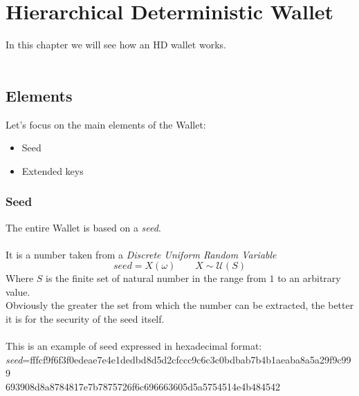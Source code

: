 
\chapter{Hierarchical Deterministic Wallet} %

\label{hd wallet} %




In this chapter we will see how an HD wallet works.
\\ \\
\section{Elements}
Let's focus on the main elements of the Wallet:
\begin{itemize}[label=$\diamond$]
	\item Seed
	\item Extended keys
\end{itemize}

\subsection{Seed}
The entire Wallet is based on a \textit{seed}.
\\ \\
It is a number taken from a \textit{Discrete Uniform Random Variable}
\begin{equation*}
seed=X(\omega) \qquad X\sim \mathcal{U}(S)
\end{equation*}
Where $S$ is the finite set of natural number in the range from $1$ to an arbitrary value.\\ Obviously the greater the set from which the number can be extracted, the better it is for the security of the seed itself.
\\ \\
This is an example of seed expressed in hexadecimal format: \\
\textit{seed}=fffcf9f6f3f0edeae7e4e1dedbd8d5d2cfccc9c6c3c0bdbab7b4b1aeaba8a5a29f9c999 \\ 693908d8a8784817e7b7875726f6c696663605d5a5754514e4b484542 

